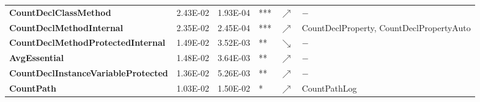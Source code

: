 \begin{sidewaystable}
\begin{tabularx}{\columnwidth}{>{\bfseries}lrrlcl}
CountDeclClassMethod                       & 2.43E-02 & 1.93E-04 & *** & $\nearrow$ &             $-$                                                                                                                                                                                                                                                                                                                                                     \\
CountDeclMethodInternal                    & 2.35E-02 & 2.45E-04 & *** & $\nearrow$ & CountDeclProperty, CountDeclPropertyAuto                                                                                                                                                                                                                                                                                                                        \\
CountDeclMethodProtectedInternal           & 1.49E-02 & 3.52E-03 & **  & $\searrow$ &         $-$                                                                                                                                                                                                                                                                                                                                                         \\
AvgEssential                               & 1.48E-02 & 3.64E-03 & **  & $\nearrow$ &   $-$                                                                                                                                                                                                                                                                                                                                                               \\
CountDeclInstanceVariableProtected         & 1.36E-02 & 5.26E-03 & **  & $\nearrow$ &   $-$                                                                                                                                                                                                                                                                                                                                                               \\
CountPath                                  & 1.03E-02 & 1.50E-02 & *   & $\nearrow$ & CountPathLog                                                                                                                                                                                                                                                                                                                                                    \\

\end{tabularx}
\end{sidewaystable}
